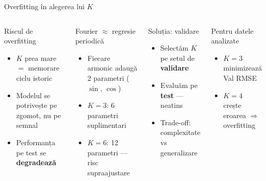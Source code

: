 \documentclass[9pt, aspectratio=169, t]{beamer}
\begin{document}
\begin{frame}{Overfitting în alegerea lui $K$}
    \begin{columns}[T]
        \begin{alertblock}{Riscul de overfitting}
            \begin{itemize}\setlength{\itemsep}{0pt}
                \item $K$ prea mare $=$ memorare ciclu istoric
                \item Modelul se potrivește pe zgomot, nu pe semnal
                \item Performanța pe test se \textbf{degradează}
            \end{itemize}
        \end{alertblock}

        \vspace{0.2cm}

        \begin{block}{Fourier $\approx$ regresie periodică}
            \begin{itemize}\setlength{\itemsep}{0pt}
                \item Fiecare armonic adaugă 2 parametri ($\sin$, $\cos$)
                \item $K = 3$: 6 parametri suplimentari
                \item $K = 6$: 12 parametri --- risc supraajustare
            \end{itemize}
        \end{block}

        \begin{exampleblock}{Soluția: validare}
            \begin{itemize}\setlength{\itemsep}{0pt}
                \item Selectăm $K$ pe setul de \textbf{validare}
                \item Evaluăm pe \textbf{test} --- neatins
                \item Trade-off: complexitate vs generalizare
            \end{itemize}
        \end{exampleblock}

        \vspace{0.2cm}

        \begin{block}{Pentru datele analizate}
            \begin{itemize}\setlength{\itemsep}{0pt}
                \item $K = 3$ minimizează Val RMSE
                \item $K = 4$ crește eroarea $\Rightarrow$ overfitting
            \end{itemize}
        \end{block}
    \end{columns}
\end{frame}
\end{document}
